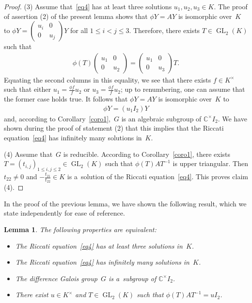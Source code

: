 \documentclass[11pt]{article}
\numberwithin{equation}{section}
\newtheorem{Lemma}[Theorem]{Lemma}
\begin{document}
\begin{proof}
(3) Assume that~\eqref{eq4} has at least three solutions $u_{1},u_{2},u_{3}\in K$.
The proof of assertion (2) of the present lemma shows that $\phi Y=AY$ is isomorphic over~$K$ to $\phi Y=
\begin{pmatrix}
u_{i}&0
\\
0&u_{j}
\end{pmatrix}
Y$ for all $1\leq i<j \leq 3$.
Therefore, there exists $T \in \operatorname{GL}_{2}(K)$ such that
\begin{gather*}
\phi(T)
\begin{pmatrix}
u_{1}&0
\\
0&u_{2}
\end{pmatrix}
=
\begin{pmatrix}
u_{1}&0
\\
0&u_{3}
\end{pmatrix}
T.
\end{gather*}
Equating the second columns in this equality, we see that there exists ${f\in K^{\times}}$ such that either
$u_{1}=\frac{\phi f}{f}u_{2}$ or $u_{3}=\frac{\phi f}{f}u_{2}$; up to renumbering, one can assume that the former case
holds true.
It follows that $\phi Y=AY$ is isomorphic over~$K$ to
\begin{gather*}
\phi Y=(u_{1} I_{2}) Y
\end{gather*}
and, according to Corollary~\ref{coro1},~$G$ is an algebraic subgroup of $\mathbb C^{\times} I_{2}$.
We have shown during the proof of statement (2) that this implies that the Riccati equation~\eqref{eq4} has inf\/initely
many solutions in~$K$.

(4) Assume that~$G$ is reducible.
According to Corollary~\ref{coro1}, there exists $T=(t_{i,j})_{1 \leq i,j\leq 2}\in \operatorname{GL}_{2}(K)$ such that
$\phi(T)AT^{-1}$ is upper triangular.
Then $t_{22}\neq 0$ and $-\frac{t_{21}}{t_{22}}\in K$ is a~solution of the Riccati equation~\eqref{eq4}.
This proves claim (4).
\end{proof}

In the proof of the previous lemma, we have shown the following result, which we state independently for ease of
reference.

\begin{Lemma}
\label{lem ric irred bis}
The following properties are equivalent:
\begin{itemize}\itemsep=0pt
\item The Riccati equation~\eqref{eq4} has at least three solutions in~$K$.
\item The Riccati equation~\eqref{eq4} has infinitely many solutions in~$K$.
\item The difference Galois group~$G$ is a~subgroup of $\mathbb C^{\times}I_{2}$.
\item There exist $u \in K^{\times}$ and $T \in \operatorname{GL}_2(K)$ such that $\phi(T)AT^{-1} = u I_{2}$.
\end{itemize}
\end{Lemma}
\end{document}
